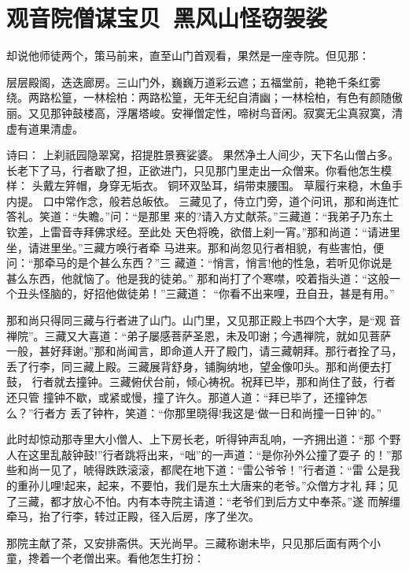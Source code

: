 \chapter{观音院僧谋宝贝~黑风山怪窃袈裟}

却说他师徒两个，策马前来，直至山门首观看，果然是一座寺院。但见那：

层层殿阁，迭迭廊房。三山门外，巍巍万道彩云遮；五福堂前，艳艳千条红雾
绕。两路松篁，一林桧柏：两路松篁，无年无纪自清幽；一林桧柏，有色有颜随傲
丽。又见那钟鼓楼高，浮屠塔峻。安禅僧定性，啼树鸟音闲。寂寞无尘真寂寞，清
虚有道果清虚。

诗曰：
上刹祇园隐翠窝，招提胜景赛娑婆。
果然净土人间少，天下名山僧占多。
长老下了马，行者歇了担，正欲进门，只见那门里走出一众僧来。你看他怎生模样：
头戴左笄帽，身穿无垢衣。
铜环双坠耳，绢带束腰围。
草履行来稳，木鱼手内提。
口中常作念，般若总皈依。
三藏见了，侍立门旁，道个问讯，那和尚连忙答礼。笑道：“失瞻。”问：“是那里
来的?请入方丈献茶。”三藏道：“我弟子乃东土钦差，上雷音寺拜佛求经。至此处
天色将晚，欲借上刹一宵。”那和尚道：“请进里坐，请进里坐。”三藏方唤行者牵
马进来。那和尚忽见行者相貌，有些害怕，便问：“那牵马的是个甚么东西？”三
藏道：“悄言，悄言!他的性急，若听见你说是甚么东西，他就恼了。他是我的徒弟。”
那和尚打了个寒噤，咬着指头道：“这般一个丑头怪脑的，好招他做徒弟！”三藏道：
“你看不出来哩，丑自丑，甚是有用。”

那和尚只得同三藏与行者进了山门。山门里，又见那正殿上书四个大字，是“观
音禅院”。三藏又大喜道：“弟子屡感菩萨圣恩，未及叩谢；今遇禅院，就如见菩萨
一般，甚好拜谢。”那和尚闻言，即命道人开了殿门，请三藏朝拜。那行者拴了马，
丢了行李，同三藏上殿。三藏展背舒身，铺胸纳地，望金像叩头。那和尚便去打鼓，
行者就去撞钟。三藏俯伏台前，倾心祷祝。祝拜已毕，那和尚住了鼓，行者还只管
撞钟不歇，或紧或慢，撞了许久。那道人道：“拜已毕了，还撞钟怎么？”行者方
丢了钟杵，笑道：“你那里晓得!我这是‘做一日和尚撞一日钟’的。”

此时却惊动那寺里大小僧人、上下房长老，听得钟声乱响，一齐拥出道：“那
个野人在这里乱敲钟鼓!”行者跳将出来，“咄”的一声道：“是你孙外公撞了耍子
的！”那些和尚一见了，唬得跌跌滚滚，都爬在地下道：“雷公爷爷！”行者道：“雷
公是我的重孙儿哩!起来，起来，不要怕，我们是东土大唐来的老爷。”众僧方才礼
拜；见了三藏，都才放心不怕。内有本寺院主请道：“老爷们到后方丈中奉茶。”遂
而解缰牵马，抬了行李，转过正殿，径入后房，序了坐次。

那院主献了茶，又安排斋供。天光尚早。三藏称谢未毕，只见那后面有两个小
童，搀着一个老僧出来。看他怎生打扮：

